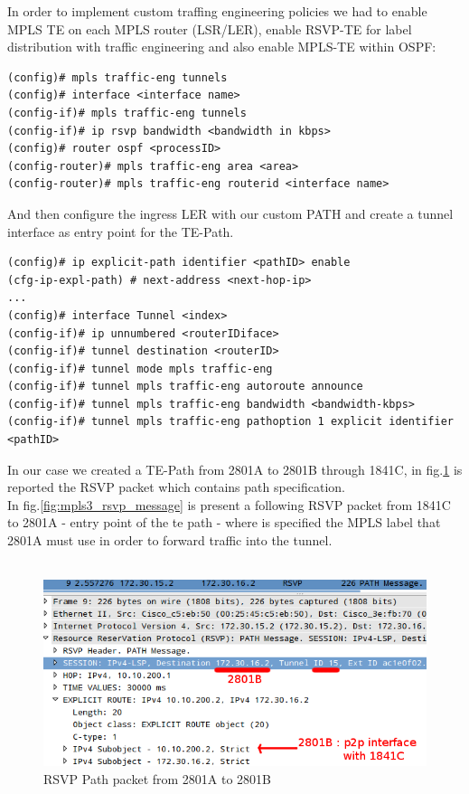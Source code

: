 \documentclass{llncs}
\begin{document}
In order to implement custom traffing engineering policies we had to enable MPLS TE on each MPLS router (LSR/LER), enable RSVP-TE for label distribution with traffic engineering and also enable MPLS-TE within OSPF:
\begin{verbatim}
(config)# mpls traffic-eng tunnels
(config)# interface <interface name>
(config-if)# mpls traffic-eng tunnels
(config-if)# ip rsvp bandwidth <bandwidth in kbps>
(config)# router ospf <processID>
(config-router)# mpls traffic-eng area <area>
(config-router)# mpls traffic-eng router­id <interface name>
\end{verbatim}
And then configure the ingress LER with our custom PATH and create a tunnel interface as entry point for the TE-Path.
\begin{verbatim}
(config)# ip explicit-path identifier <pathID> enable
(cfg-ip-expl-path) # next-address <next-hop-ip>
...
(config)# interface Tunnel <index>
(config-if)# ip unnumbered <routerIDiface>
(config-if)# tunnel destination <routerID>
(config-if)# tunnel mode mpls traffic-eng
(config-if)# tunnel mpls traffic-eng autoroute announce
(config-if)# tunnel mpls traffic-eng bandwidth <bandwidth-kbps>
(config-if)# tunnel mpls traffic-eng path­option 1 explicit identifier <pathID>
\end{verbatim}

In our case we created a TE-Path from 2801A to 2801B through 1841C, in fig.\ref{fig:mpls3_rsvp_path} is reported the RSVP packet which contains path specification.\\
In fig.\ref{fig:mpls3_rsvp_message} is present a following RSVP packet from 1841C to 2801A - entry point of the te path - where is specified the MPLS label that 2801A must use in order to forward traffic into the tunnel.\\
\\
\begin{figure}
\centering
\includegraphics[width=1.0\textwidth]{../e5/rsvp_path.png}
\caption{RSVP Path packet from 2801A to 2801B}
\label{fig:mpls3_rsvp_path}
\end{figure}
\end{document}
